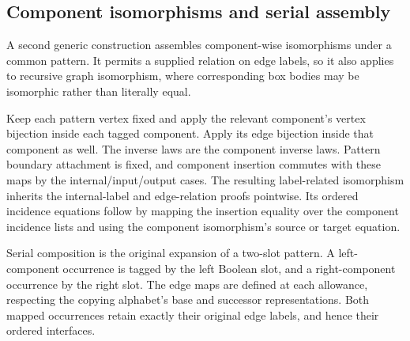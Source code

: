 



\subsection{Component isomorphisms and serial assembly}

A second generic construction assembles component-wise isomorphisms under
a common pattern. It permits a supplied relation on edge labels, so it also
applies to recursive graph isomorphism, where corresponding box bodies may
be isomorphic rather than literally equal.

Keep each pattern vertex fixed and apply the relevant component's vertex
bijection inside each tagged component. Apply its edge bijection inside
that component as well. The inverse laws are the component inverse laws.
Pattern boundary attachment is fixed, and component insertion commutes with
these maps by the internal/input/output cases. The resulting label-related
isomorphism inherits the internal-label and edge-relation proofs pointwise.
Its ordered incidence equations follow by mapping the insertion equality
over the component incidence lists and using the component isomorphism's
source or target equation.











Serial composition is the original expansion of a two-slot pattern.
A left-component occurrence is tagged by the left Boolean slot, and a
right-component occurrence by the right slot. The edge maps are defined
at each allowance, respecting the copying alphabet's base and successor
representations. Both mapped occurrences retain exactly their original
edge labels, and hence their ordered interfaces.







